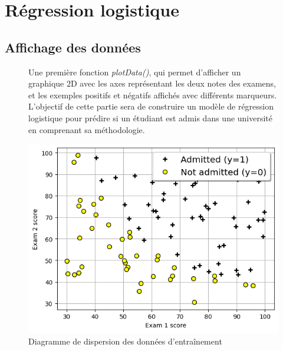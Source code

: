 \section{Régression logistique}
\subsection{Affichage des données}

\begin{figure}[!h]
    \begin{minipage}{.48\linewidth}
            Une première fonction \textit{plotData()}, qui permet d'afficher un graphique 2D avec les axes représentant les deux notes des examens, et les exemples positifs et négatifs affichés avec différents marqueurs. \\
            L'objectif de cette partie sera de construire un modèle de régression logistique pour prédire si un étudiant est admis dans une université en comprenant sa méthodologie.
    \end{minipage}
    \begin{minipage}{.48\linewidth}
        \begin{center}
            \includegraphics[width=1\textwidth]{./img/3.1.png}
            \caption{\label{fig:fig1}Diagramme de dispersion des données d'entraînement}  
        \end{center}
    \end{minipage}\hfill
\end{figure}

